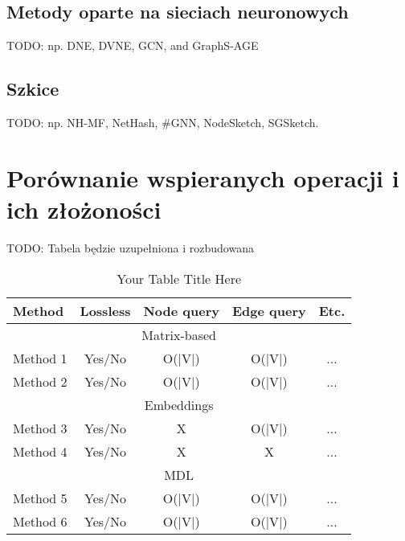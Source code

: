     \subsection{Metody oparte na sieciach neuronowych}
        TODO: np. DNE, DVNE, GCN, and GraphS-AGE

    \subsection{Szkice}
        TODO: np. NH-MF, NetHash, \#GNN, NodeSketch\cite{Yang_Rosso_Li_Cudre-Mauroux_2019}, SGSketch\cite{Yang_Qu_Yang_Wang_Cudre-Mauroux_2022}.

\section{Porównanie wspieranych operacji i ich złożoności}
    TODO: Tabela będzie uzupełniona i rozbudowana

    \begin{table}[htbp]
        \centering
        \caption{Your Table Title Here}
        \begin{tabular}{l | c | c | c | c}
        \toprule
        \textbf{Method} & \textbf{Lossless} & \textbf{Node query} & \textbf{Edge query} & \textbf{Etc.} \\
        \midrule
        \multicolumn{5}{c}{Matrix-based} \\
        \midrule
        Method 1 & Yes/No & O(|V|) & O(|V|) & ... \\
        Method 2 & Yes/No & O(|V|) & O(|V|) & ... \\
        \midrule
        \multicolumn{5}{c}{Embeddings} \\
        \midrule
        Method 3 & Yes/No & X & O(|V|) & ... \\
        Method 4 & Yes/No & X & X & ... \\
        \midrule
        \multicolumn{5}{c}{MDL} \\
        \midrule
        Method 5 & Yes/No & O(|V|) & O(|V|) & ... \\
        Method 6 & Yes/No & O(|V|) & O(|V|) & ... \\
        \bottomrule
        \end{tabular}
    \end{table}